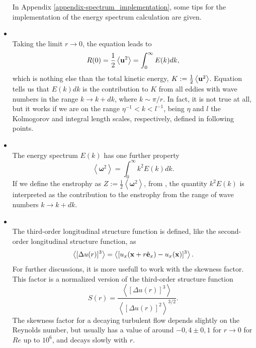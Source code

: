 \begin{itemize}
In Appendix \ref{appendix-spectrum_implementation}, some tips for the implementation of the energy spectrum calculation are given.
\item{}\\ Taking the limit $r\rightarrow 0$, the equation  leads to
\begin{equation}
\label{eq-total_kinetic_energy}
R(0)=\frac{1}{2}\left\langle{\bf u}^2\right\rangle=\int_0^\infty E(k)dk,
\end{equation}
which is nothing else than the total kinetic energy, $K:=\frac{1}{2}\left\langle{\bf u}^2\right\rangle$. Equation  tells us that $E(k)dk$ is the contribution to $K$ from all eddies with wave numbers in the range $k\rightarrow k+dk$, where $k\sim\pi/r$. In fact, it is not true at all, but it works if we are on the range $\eta^{-1}<k<l^{-1}$, being $\eta$ and $l$ the Kolmogorov and integral length scales, respectively, defined in following points.
\item{}\\ The energy spectrum $E(k)$ has one further property
\begin{equation}
\label{eq-enstrophy}
\left\langle\boldsymbol{\omega}^2\right\rangle=\int_0^\infty k^2E(k)dk.
\end{equation}
If we define the enstrophy as $Z:=\frac{1}{2}\left\langle\boldsymbol{\omega}^2\right\rangle$, from , the quantity $k^2E(k)$ is interpreted as the contribution to the enstrophy from the range of wave numbers $k\rightarrow k+dk$.
\item{}\\ The third-order longitudinal structure function is defined, like the second-order longitudinal structure function, as
\begin{equation*}
\label{eq-third_order_structure}
\left\langle[\Delta u(r)]^3\right\rangle=\left\langle[u_x({\bf x}+r\hat{{\bf e}}_x)-u_x({\bf x})]^3\right\rangle.
\end{equation*}
For further discussions, it is more usefull to work with the skewness factor. This factor is a normalized version of the third-order structure function
\begin{equation}
\label{eq-skewness_factor}
S(r)=\frac{\left\langle[\Delta u(r)]^3\right\rangle}{\left\langle[\Delta u(r)]^2\right\rangle^{3/2}}.
\end{equation}
The skewness factor for a decaying turbulent flow depends slightly on the Reynolds number, but usually has a value of around $-0,4\pm0,1$ for $r\rightarrow0$ for $Re$ up to $10^6$, and decays slowly with $r$.

\end{itemize}
